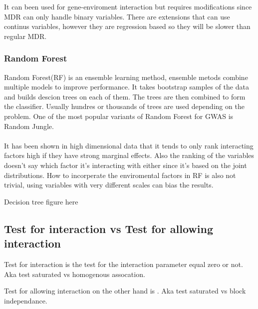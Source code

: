 \documentclass[10pt,a4paper]{article}
\begin{document}
It can been used for gene-enviroment interaction but requires modifications since MDR can only handle binary variables. There are extensions that can use continus variables, however they are regression based so they will be slower than regular MDR.\cite{gene_enviroment_2013}

\subsubsection{Random Forest}
Random Forest(RF) is an ensemble learning method, ensemble metods combine multiple models to improve performance. It takes bootstrap samples of the data and builds descion trees on each of them. The trees are then combined to form the classifier. Usually hundres or thousands of trees are used depending on the problem\cite{random_forest}. One of the most popular variants of Random Forest for GWAS is Random Jungle\cite{random_jungle}.\\
\\
It has been shown in high dimensional data that it tends to only rank interacting factors high if they have strong marginal effects\cite{winham_rf_2012}. Also the ranking of the variables doesn't say which factor it's interacting with either since it's based on the joint distributions\cite{gene_enviroment_2013}. How to incorperate the enviromental factors in RF is also not trivial, using variables with very different scales can bias the results\cite{gene_enviroment_2013}.

Decision tree figure here


\subsection{Test for interaction vs Test for allowing interaction}
\label{test_type}
Test for interaction is the test for the interaction parameter equal zero or not. Aka test saturated vs homogenous assocation\cite{boost_gene_gene}.

Test for allowing interaction on the other hand is . Aka test saturated vs block independance\cite{boost_gene_gene}.
\end{document}
